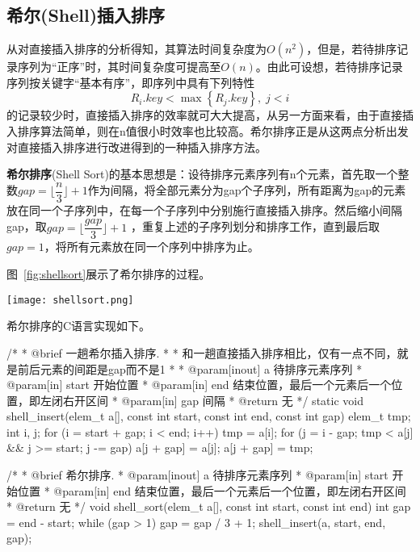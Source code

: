 \subsection{希尔(Shell)插入排序}
从对直接插入排序的分析得知，其算法时间复杂度为$O(n^2)$，但是，若待排序记录序列为“正序”时，其时间复杂度可提高至$O(n)$。由此可设想，若待排序记录序列按关键字“基本有序”，即序列中具有下列特性
$$R_i.key < \max\left\{R_j.key\right\},\; j<i$$
的记录较少时，直接插入排序的效率就可大大提高，从另一方面来看，由于直接插入排序算法简单，则在n值很小时效率也比较高。希尔排序正是从这两点分析出发对直接插入排序进行改进得到的一种插入排序方法。

\textbf{希尔排序}(Shell Sort)的基本思想是：设待排序元素序列有n个元素，首先取一个整数$gap=\lfloor \dfrac{n}{3} \rfloor+1$作为间隔，将全部元素分为gap个子序列，所有距离为gap的元素放在同一个子序列中，在每一个子序列中分别施行直接插入排序。然后缩小间隔gap，取$gap=\lfloor \dfrac{gap}{3}\rfloor+1$ ，重复上述的子序列划分和排序工作，直到最后取$gap=1$，将所有元素放在同一个序列中排序为止。

图~\ref{fig:shellsort}展示了希尔排序的过程。

\begin{center}
\texttt{[image: shellsort.png]}\\
\label{fig:shellsort}
\end{center}

希尔排序的C语言实现如下。
\begin{Codex}[label=shell_sort.c]
/*
  * @brief 一趟希尔插入排序.
  *
  * 和一趟直接插入排序相比，仅有一点不同，就是前后元素的间距是gap而不是1
  *
  * @param[inout] a 待排序元素序列
  * @param[in] start 开始位置
  * @param[in] end 结束位置，最后一个元素后一个位置，即左闭右开区间
  * @param[in] gap 间隔
  * @return 无
  */
static void shell_insert(elem_t a[], const int start, const int end, const int gap) {
    elem_t tmp;
    int i, j;
    for (i = start + gap; i < end; i++) {
        tmp = a[i];
        for (j = i - gap; tmp < a[j] && j >= start; j -= gap) {
            a[j + gap] = a[j];
        }
        a[j + gap] = tmp;
    }
}

 /*
  * @brief 希尔排序.
  * @param[inout] a 待排序元素序列
  * @param[in] start 开始位置
  * @param[in] end 结束位置，最后一个元素后一个位置，即左闭右开区间
  * @return 无
  */
void shell_sort(elem_t a[], const int start, const int end) {
    int gap = end - start;
    while (gap > 1) {
        gap = gap / 3 + 1;
        shell_insert(a, start, end, gap);
    }
}
\end{Codex}


